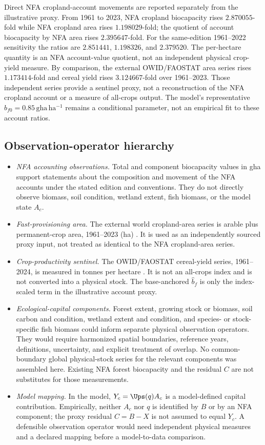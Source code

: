 Direct NFA cropland-account movements are reported separately from the illustrative proxy. From 1961 to 2023, NFA cropland biocapacity rises $2.870055$-fold while NFA cropland area rises $1.198029$-fold; the quotient of account biocapacity by NFA area rises $2.395647$-fold. For the same-edition 1961--2022 sensitivity the ratios are $2.851441$, $1.198326$, and $2.379520$. The per-hectare quantity is an NFA account-value quotient, not an independent physical crop-yield measure. By comparison, the external OWID/FAOSTAT area series rises $1.173414$-fold and cereal yield rises $3.124667$-fold over 1961--2023. Those independent series provide a sentinel proxy, not a reconstruction of the NFA cropland account or a measure of all-crops output. The model's representative $b_{f0}=0.85\,\mathrm{gha\,ha^{-1}}$ remains a conditional parameter, not an empirical fit to these account ratios.

\subsection{Observation-operator hierarchy}\label{si:operator}

\begin{itemize}[leftmargin=1.5em]
\item \emph{NFA accounting observations.} Total and component biocapacity values in gha support statements about the composition and movement of the NFA accounts under the stated edition and conventions. They do not directly observe biomass, soil condition, wetland extent, fish biomass, or the model state $A_c$.
\item \emph{Fast-provisioning area.} The external world cropland-area series is arable plus permanent-crop area, 1961--2023 (ha) \citep{OWIDCropland2026}. It is used as an independently sourced proxy input, not treated as identical to the NFA cropland-area series.
\item \emph{Crop-productivity sentinel.} The OWID/FAOSTAT cereal-yield series, 1961--2024, is measured in tonnes per hectare \citep{OWIDCereal2026}. It is not an all-crops index and is not converted into a physical stock. The base-anchored $\hat b_f$ is only the index-scaled term in the illustrative account proxy.
\item \emph{Ecological-capital components.} Forest extent, growing stock or biomass, soil carbon and condition, wetland extent and condition, and species- or stock-specific fish biomass could inform separate physical observation operators. They would require harmonized spatial boundaries, reference years, definitions, uncertainty, and explicit treatment of overlap. No common-boundary global physical-stock series for the relevant components was assembled here. Existing NFA forest biocapacity and the residual $C$ are not substitutes for those measurements.
\item \emph{Model mapping.} In the model, $Y_c=\Ups(q)A_c$ is a model-defined capital contribution. Empirically, neither $A_c$ nor $q$ is identified by $B$ or by an NFA component; the proxy residual $C=B-X$ is not assumed to equal $Y_c$. A defensible observation operator would need independent physical measures and a declared mapping before a model-to-data comparison.
\end{itemize}

